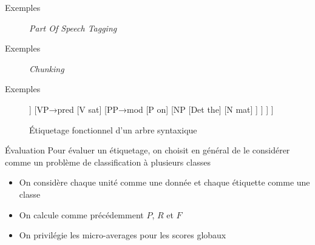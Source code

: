 \documentclass[xcolor={svgnames}, french]{beamer}
\begin{document}
\begin{frame}[fragile=singleslide]{Exemples}
	\begin{figure}
		\tikzset{external/export=true}
		\caption{\emph{Part Of Speech Tagging}}
	\end{figure}
\end{frame}

\begin{frame}[fragile=singleslide]{Exemples}
	\begin{figure}
		\tikzset{external/export=true}
		\caption{\emph{Chunking}}
	\end{figure}
\end{frame}

\begin{frame}[fragile=singleslide]{Exemples}
	\begin{figure}
		\tikzset{external/export=true}
		\begin{forest}
			[S
				[NP→\textcolor{highlighta}{sub}
					[Det the]
					[N cat]
				]
				[VP→\textcolor{highlighta}{pred}
					[V sat]
					[PP→\textcolor{highlighta}{mod}
						[P on]
						[NP
							[Det the]
							[N mat]
						]
					]
				]
			]
		\end{forest}
		\caption{\textcolor{highlighta}{Étiquetage fonctionnel} d'un arbre syntaxique}
	\end{figure}
\end{frame}

\begin{frame}{Évaluation}
	Pour évaluer un étiquetage, on choisit en général de le considérer comme un problème de classification à plusieurs classes
	\begin{itemize}
		\item On considère chaque unité comme une donnée et chaque étiquette comme une classe
		\item On calcule comme précédemment \(P\), \(R\) et \(F\)
		\item On privilégie les micro-averages pour les scores globaux
	\end{itemize}
\end{frame}
\end{document}
